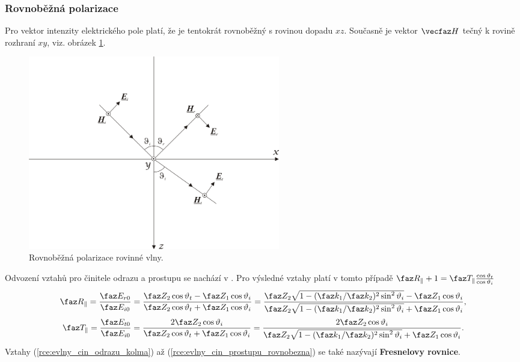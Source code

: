 \subsubsection*{Rovnoběžná polarizace}
Pro vektor intenzity elektrického pole platí, že je tentokrát rovnoběžný s rovinou dopadu $xz$. Současně je vektor $\vecfaz H$ tečný k rovině rozhraní $xy$, viz. obrázek \ref{obr:evlny_rovnobezna_polarizace}.
\begin{figure}[!h]
	\centering
	\includegraphics[width=11cm]{evlny_rovnobezna_polarizace.png}
	\caption{Rovnoběžná polarizace rovinné vlny.\cite{emp}}
	\label{obr:evlny_rovnobezna_polarizace}
\end{figure}
Odvození vztahů pro činitele odrazu a prostupu se nachází v \cite[str. 95]{emp}. Pro výsledné vztahy platí v tomto případě $\faz R_{\parallel} + 1 = \faz T_{\parallel}\frac{\cos\vartheta_{t}}{\cos\vartheta_{i}}$
\begin{equation}
	\faz R_{\parallel} = \frac{\faz E_{r0}}{\faz E_{i0}} = \frac{\faz Z_{2}\cos\vartheta_{t}-\faz Z_{1}\cos\vartheta_{i}}{\faz Z_{2}\cos\vartheta_{t}+\faz Z_{1}\cos\vartheta_{i}} = \frac{\faz Z_{2}\sqrt{1-(\faz k_{1}/\faz k_{2})^{2}\sin^{2}\vartheta_{i}}-\faz Z_{1}\cos\vartheta_{i}}{\faz Z_{2}\sqrt{1-(\faz k_{1}/\faz k_{2})^{2}\sin^{2}\vartheta_{i}}+\faz Z_{1}\cos\vartheta_{i}},
	\label{rce:evlny_cin_odrazu_rovnobezna}
\end{equation}
\begin{equation}
	\faz T_{\parallel} = \frac{\faz E_{t0}}{\faz E_{i0}} = \frac{2\faz Z_{2}\cos\vartheta_{i}}{\faz Z_{2}\cos\vartheta_{t}+\faz Z_{1}\cos\vartheta_{i}} = \frac{2\faz Z_{2}\cos\vartheta_{i}}{\faz Z_{2}\sqrt{1-(\faz k_{1}/\faz k_{2})^{2}\sin^{2}\vartheta_{i}}+\faz Z_{1}\cos\vartheta_{i}}.
	\label{rce:evlny_cin_prostupu_rovnobezna}
\end{equation}
Vztahy (\ref{rce:evlny_cin_odrazu_kolma}) až (\ref{rce:evlny_cin_prostupu_rovnobezna}) se také nazývají {\bf Fresnelovy rovnice}.

